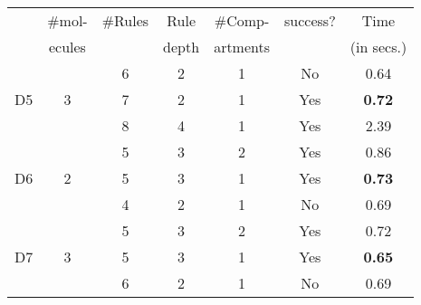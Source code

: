 \begin{table}[t]
\begin{minipage}{0.48\linewidth}
  \begin{tabular}[t]{|c|c|c|c|c|c|c|}\hline
     & \#mol- & \#Rules & Rule  & \#Comp- & success? & Time \\
         & ecules   &         & depth & artments &          & (in secs.) \\\hline
         
         
         
         
         &   & 6  & 2 & 1 & No &  0.64 \\\cline{3-7}
    D5   & 3 & 7  & 2 & 1 & Yes & {\bf 0.72}  \\\cline{3-7}
         &   & 8  & 4 & 1 & Yes  &  2.39 \\\hline
         
         &   & 5  & 3 & 2 & Yes &  0.86 \\\cline{3-7}
    D6   & 2 & 5  & 3 & 1 & Yes & {\bf 0.73}  \\\cline{3-7}
         &   & 4  & 2 & 1 & No  & 0.69  \\\hline
         
         &   & 5  & 3 & 2 & Yes &  0.72 \\\cline{3-7}
    D7   & 3 & 5  & 3 & 1 & Yes & {\bf 0.65}  \\\cline{3-7}
         &   & 6  & 2 & 1 & No  & 0.69  \\\hline
         

\end{tabular}
\end{minipage}
\end{table}
